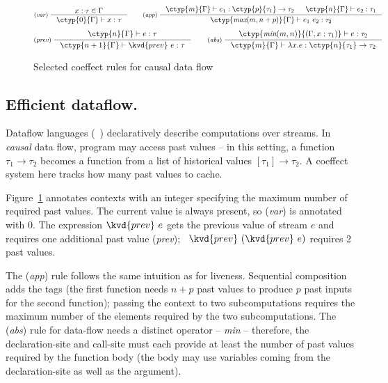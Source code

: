 
\begin{figure}[t]
\vspace{-1em}
\begin{equation*}
\inference[(\emph{var})\;]
  {x : \tau \in \Gamma}
  {\ctyp{0}{\Gamma} \vdash x : \tau }
%
\quad\quad
% 
\inference[(\emph{app})\;]
  {\ctyp{m}{\Gamma} \vdash e_1 : \ctyp{p}{\tau_1} \rightarrow \tau_2 &
   \ctyp{n}{\Gamma} \vdash e_2 : \tau_1 }
  {\ctyp{\textit{max}(m, n + p)}{\Gamma} \vdash e_1~e_2 : \tau_2}
\end{equation*}
\begin{equation*}
\inference[(\emph{prev})\;]
  {\ctyp{n}{\Gamma} \vdash e : \tau}
  {\ctyp{n+1}{\Gamma} \vdash \kvd{prev}~e : \tau}
%
\quad\quad
%
\inference[(\emph{abs})\;]
  {\ctyp{\textit{min}(m, n)}{(\Gamma, x:\tau_1)} \vdash e : \tau_2}
  {\ctyp{m}{\Gamma} \vdash \lambda x.e : \ctyp{n}{\tau_1} \rightarrow \tau_2 }
\end{equation*}
\vspace{-1em}
\caption{Selected coeffect rules for causal data flow}
\label{fig:example-dataflow}
\vspace{-1em}
\end{figure}


\vspace{-1em}
\subsection{Efficient dataflow.}
Dataflow languages (\eg~\cite{app-lucid}) declaratively describe
computations over streams. In \emph{causal} data flow, program may
access past values -- in this setting, a function $\tau_1 \rightarrow
\tau_2$ becomes a function from a list of historical values $[\tau_1]
\rightarrow \tau_2$. A coeffect system here tracks how many past values
to cache.

Figure~\ref{fig:example-dataflow} annotates contexts with an integer specifying the maximum
number of required past values. The current value is always present, so (\emph{var}) is annotated with $0$.
The expression $\kvd{prev}~e$ gets the previous value of stream $e$ and requires one
additional past value (\emph{prev}); \eg~$\kvd{prev}~(\kvd{prev}~e)$ requires 2 past values.

The (\emph{app}) rule follows the same intuition as for liveness. Sequential composition
adds the tags (the first function needs $n + p$ past values to produce $p$ past inputs
for the second function); passing the context to two subcomputations requires the maximum
number of the elements required by the two subcomputations. The (\emph{abs}) rule for data-flow 
needs a distinct operator -- \emph{min} -- therefore, the declaration-site and 
call-site must each provide at least the number of past values required by the function body
(the body may use variables coming from the declaration-site as well as the argument).

